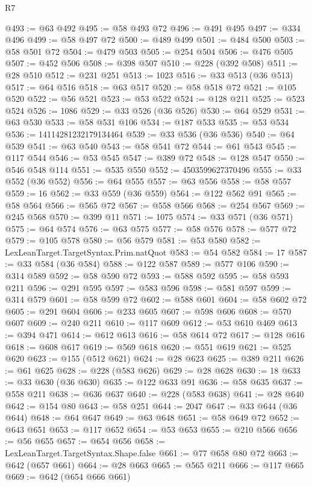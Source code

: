 \begin{lexlean}{R7}
\begin{coremodule}
@493 := @63 @492
@495 := @58 @493 @72
@496 := @491 @495
@497 := @334 @496
@499 := @58 @497 @72
@500 := @489 @499
@501 := @484 @500
@503 := @58 @501 @72
@504 := @479 @503
@505 := @254 @504
@506 := @476 @505
@507 := @452 @506
@508 := @398 @507
@510 := @228 (@392 @508)
@511 := @28 @510
@512 := @231 @251
@513 := 1023
@516 := @33 @513 (@36 @513)
@517 := @64 @516
@518 := @63 @517
@520 := @58 @518 @72
@521 := @105 @520
@522 := @56 @521
@523 := @53 @522
@524 := @128 @211
@525 := @523 @524
@526 := 1086
@529 := @33 @526 (@36 @526)
@530 := @64 @529
@531 := @63 @530
@533 := @58 @531 @106
@534 := @187 @533
@535 := @53 @534
@536 := 14114281232179134464
@539 := @33 @536 (@36 @536)
@540 := @64 @539
@541 := @63 @540
@543 := @58 @541 @72
@544 := @61 @543
@545 := @117 @544
@546 := @53 @545
@547 := @389 @72
@548 := @128 @547
@550 := @546 @548 @114
@551 := @535 @550
@552 := 4503599627370496
@555 := @33 @552 (@36 @552)
@556 := @64 @555
@557 := @63 @556
@558 := @58 @557
@559 := 16
@562 := @33 @559 (@36 @559)
@564 := @122 @562 @91
@565 := @58 @564
@566 := @565 @72
@567 := @558 @566
@568 := @254 @567
@569 := @245 @568
@570 := @399 @11
@571 := 1075
@574 := @33 @571 (@36 @571)
@575 := @64 @574
@576 := @63 @575
@577 := @58 @576
@578 := @577 @72
@579 := @105 @578
@580 := @56 @579
@581 := @53 @580
@582 := LexLeanTarget.TargetSyntax.Prim.natQuot
@583 := @54 @582
@584 := 17
@587 := @33 @584 (@36 @584)
@588 := @122 @587
@589 := @577 @106
@590 := @314 @589
@592 := @58 @590 @72
@593 := @588 @592
@595 := @58 @593 @211
@596 := @291 @595
@597 := @583 @596
@598 := @581 @597
@599 := @314 @579
@601 := @58 @599 @72
@602 := @588 @601
@604 := @58 @602 @72
@605 := @291 @604
@606 := @233 @605
@607 := @598 @606
@608 := @570 @607
@609 := @240 @211
@610 := @117 @609
@612 := @53 @610 @469
@613 := @394 @471
@614 := @612 @613
@616 := @58 @614 @72
@617 := @128 @616
@618 := @608 @617
@619 := @569 @618
@620 := @551 @619
@621 := @525 @620
@623 := @155 (@512 @621)
@624 := @28 @623
@625 := @389 @211
@626 := @61 @625
@628 := @228 (@583 @626)
@629 := @28 @628
@630 := 18
@633 := @33 @630 (@36 @630)
@635 := @122 @633 @91
@636 := @58 @635
@637 := @558 @211
@638 := @636 @637
@640 := @228 (@583 @638)
@641 := @28 @640
@642 := @154 @80
@643 := @58 @251
@644 := 2047
@647 := @33 @644 (@36 @644)
@648 := @64 @647
@649 := @63 @648
@651 := @58 @649 @72
@652 := @643 @651
@653 := @117 @652
@654 := @53 @653
@655 := @210 @566
@656 := @56 @655
@657 := @654 @656
@658 := LexLeanTarget.TargetSyntax.Shape.false
@661 := @77 @658 @80 @72
@663 := @642 (@657 @661)
@664 := @28 @663
@665 := @565 @211
@666 := @117 @665
@669 := @642 (@654 @666 @661)

\end{coremodule}
\end{lexlean}
